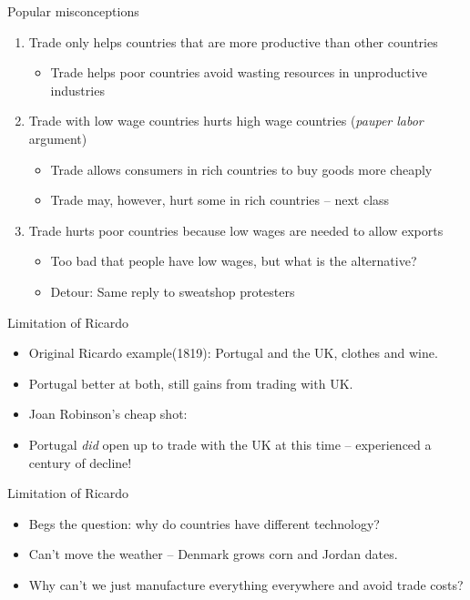 \documentclass[ignorenonframetext,]{beamer}
\begin{document}
\begin{frame}{Popular misconceptions}

    \begin{enumerate}
        \item Trade only helps countries that are more productive than other countries
        \begin{itemize}
            \item Trade helps poor countries avoid wasting resources in unproductive industries
        \end{itemize}
        \item Trade with low wage countries hurts high wage countries (\emph{pauper labor} argument)
        \begin{itemize}
        \item Trade allows consumers in rich countries to buy goods more cheaply
        \item Trade may, however, hurt some in rich countries -- next class
        \end{itemize}
        \item Trade hurts poor countries because low wages are needed to allow exports
        \begin{itemize}
            \item Too bad that people have low wages, but what is the alternative?
            \item Detour: Same reply to sweatshop protesters
        \end{itemize}
    \end{enumerate}

\end{frame}

\begin{frame}{Limitation of Ricardo}

    \begin{itemize}
        \item Original Ricardo example(1819): Portugal and the UK, clothes and wine.
        \item Portugal better at both, still gains from trading with UK.
        \item Joan Robinson's cheap shot: 
        \item Portugal \emph{did} open up to trade with the UK at this time -- experienced a century of decline!
    \end{itemize}

\end{frame}

\begin{frame}{Limitation of Ricardo}

    \begin{itemize}
        \item Begs the question: why do countries have different technology?
        \item Can't move the weather -- Denmark grows corn and Jordan dates.
        \item Why can't we just manufacture everything everywhere and avoid trade costs?
    \end{itemize}

\end{frame}
\end{document}
